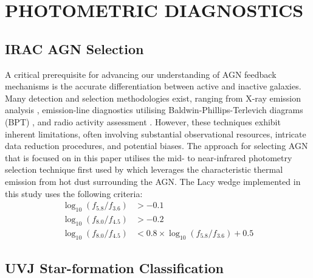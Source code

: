 \documentclass[
  journal=pasa,
  manuscript=research-paper,
  year=202X,
  volume=YY,
]{cup-journal}
\begin{document}
\section{PHOTOMETRIC DIAGNOSTICS}
\label{sec:photometricdiagnostics}

\subsection{IRAC AGN Selection}
\label{subsec:irac_diagnostic}

A critical prerequisite for advancing our understanding of AGN feedback mechanisms is the accurate differentiation between active and inactive galaxies. Many detection and selection methodologies exist, ranging from X-ray emission analysis \citep{szokoly_chandra_2004}, emission-line diagnostics utilising Baldwin-Phillips-Terlevich diagrams (BPT) \citep{baldwin_classification_1981}, and radio activity assessment \citep{rees_radio_2016}. However, these techniques exhibit inherent limitations, often involving substantial observational resources, intricate data reduction procedures, and potential biases. The approach for selecting AGN that is focused on in this paper utilises the mid- to near-infrared photometry selection technique first used by \cite{lacy_obscured_2004} which leverages the characteristic thermal emission from hot dust surrounding the AGN. The Lacy wedge implemented in this study uses the following criteria:
\begin{align*}
    \log_{10}\left(f_{5.8}/f_{3.6}\right) &> -0.1\\
    \log_{10}\left(f_{8.0}/f_{4.5}\right) &> -0.2\\
    \log_{10}\left(f_{8.0}/f_{4.5}\right) &< 0.8 \times \log_{10}\left(f_{5.8}/f_{3.6}\right) + 0.5
\end{align*}

\subsection{UVJ Star-formation Classification}
\label{subsec:uvj_diagnostic}
\end{document}
